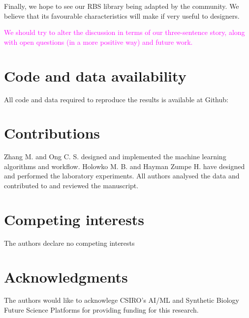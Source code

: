 \documentclass{article}
\newcommand{\mengyan}[1]{\textcolor{magenta}{#1}}
\begin{document}
Finally, we hope to see our RBS library being adapted by the community.
We believe that its favourable characteristics will make if very useful to designers.

\mengyan{We should try to alter the discussion in terms of our three-sentence story, along with open questions (in a more positive way) and future work.}



\section*{Code and data availability}

All code and data required to reproduce the results is available at Github: 

\section*{Contributions}
Zhang M. and Ong C. S. designed and implemented the machine learning algorithms and workflow. Holowko M. B. and Hayman Zumpe H. have designed and performed the laboratory experiments. All authors analysed the data and contributed to and reviewed the manuscript.

\section*{Competing interests}
The authors declare no competing interests

\section*{Acknowledgments}
The authors would like to acknowlege CSIRO's AI/ML and Synthetic Biology Future Science Platforms for providing funding for this research.


\newpage

\printbibliography

\clearpage

\appendix

\end{document}
